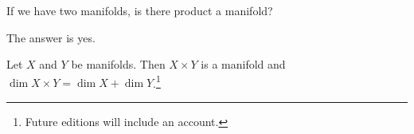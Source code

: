 

If we have two manifolds, is there product a manifold?


The answer is yes.

\begin{proposition}
  Let $X$ and $Y$ be manifolds. Then $X \times Y$ is a manifold and $\dim X \times Y = \dim X + \dim Y$.\footnote{Future editions will include an account.}
\end{proposition}

\blankpage
